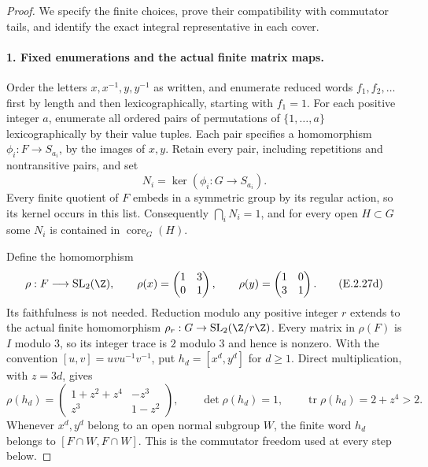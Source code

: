 \begin{proof}
We specify the finite choices, prove their compatibility with
commutator tails, and identify the exact integral representative
in each cover.

\paragraph{1. Fixed enumerations and the actual finite matrix maps.}
Order the letters \(x,x^{-1},y,y^{-1}\) as written, and enumerate
reduced words \(f_1,f_2,\ldots\) first by length and then
lexicographically, starting with \(f_1=1\). For each positive
integer \(a\), enumerate all ordered pairs of permutations of
\(\{1,\ldots,a\}\) lexicographically by their value tuples. Each
pair specifies a homomorphism
\(\phi_i:F\to S_{a_i}\), by the images of \(x,y\).
Retain every pair, including repetitions and nontransitive pairs,
and set
\[
 N_i=\ker(\phi_i:G\longrightarrow S_{a_i}).
 \tag{E.2.27c}
\]
Every finite quotient of \(F\) embeds in a symmetric group by its
regular action, so its kernel occurs in this list. Consequently
\(\bigcap_iN_i=1\), and for every open \(H\subset G\) some
\(N_i\) is contained in \(\operatorname{core}_G(H)\).

Define the homomorphism
\[
 \rho:F\longrightarrow\operatorname{SL}_2(\Z),\qquad
 \rho(x)=\begin{pmatrix}1&3\\0&1\end{pmatrix},\qquad
 \rho(y)=\begin{pmatrix}1&0\\3&1\end{pmatrix}.
 \tag{E.2.27d}
\]
Its faithfulness is not needed. Reduction modulo any positive
integer \(r\) extends to the actual finite homomorphism
\(\rho_r:G\to\operatorname{SL}_2(\Z/r\Z)\).
Every matrix in \(\rho(F)\) is \(I\) modulo \(3\), so its
integer trace is \(2\) modulo \(3\) and hence is nonzero.
With the convention \([u,v]=uvu^{-1}v^{-1}\), put
\(h_d=[x^d,y^d]\) for \(d\geq1\). Direct multiplication,
with \(z=3d\), gives
\[
 \rho(h_d)=
 \begin{pmatrix}1+z^2+z^4&-z^3\\z^3&1-z^2\end{pmatrix},
 \qquad \det\rho(h_d)=1,
 \qquad \operatorname{tr}\rho(h_d)=2+z^4>2.
 \tag{E.2.27e}
\]
Whenever \(x^d,y^d\) belong to an open normal subgroup \(W\),
the finite word \(h_d\) belongs to
\([F\cap W,F\cap W]\). This is the commutator freedom used
at every step below.


\end{proof}

